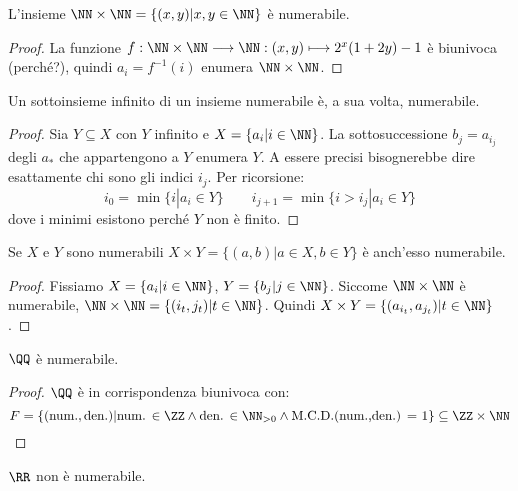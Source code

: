 \documentclass[11pt]{scrartcl}
\begin{document}
\begin{examplem}
L'insieme $\NN \times \NN = \{(x,y) | x,y \in \NN\}$ è numerabile.
\end{examplem}

\begin{proof}
La funzione $f : \NN \times \NN \longrightarrow \NN : (x,y) \longmapsto 2^x(1+2y) - 1$ è biunivoca (perché?), quindi $a_i = f^{-1}(i)$ enumera $\NN \times \NN$.
\end{proof}

\begin{proposition}
Un sottoinsieme infinito di un insieme numerabile è, a sua volta, numerabile.
\end{proposition}

\begin{proof}
Sia $Y \subseteq X$ con $Y$ infinito e $X = \{a_i | i \in \NN\}$. La sottosuccessione $b_j = a_{i_j}$ degli $a_*$ che appartengono a $Y$ enumera $Y$. A essere precisi 
bisognerebbe dire esattamente chi sono gli indici $i_j$. Per ricorsione:
\[ i_0 = \min\{i | a_i \in Y\} \qquad i_{j+1} = \min\{i > i_j | a_i \in Y\}
	\]
dove i minimi esistono perché $Y$ non è finito.
\end{proof}

\begin{proposition}
Se $X$ e $Y$ sono numerabili $X \times Y = \{(a,b) | a \in X, b \in Y\}$ è anch'esso numerabile.
\end{proposition}

\begin{proof}
Fissiamo $X = \{a_i | i \in \NN\}$, $Y = \{b_j | j \in \NN\}$. Siccome $\NN \times \NN$ è numerabile, $\NN \times \NN = \{(i_t,j_t)|t \in \NN\}$.
Quindi $X \times Y = \{(a_{i_t}, a_{j_t}) | t \in \NN\}$.
\end{proof}

\begin{example}
$\QQ$ è numerabile.
\end{example}

\begin{proof}
$\QQ$ è in corrispondenza biunivoca con:
\[F = \{(\text{num.},\text{den.}) | \text{num. $\in \ZZ$} \wedge \text{den. $\in\NN_{>0}$} \wedge \text{M.C.D.(num.,den.) = 1}\} \subseteq \ZZ \times \NN\]
\end{proof}

\begin{notexample}
$\RR$ non è numerabile.
\end{notexample}
\end{document}
